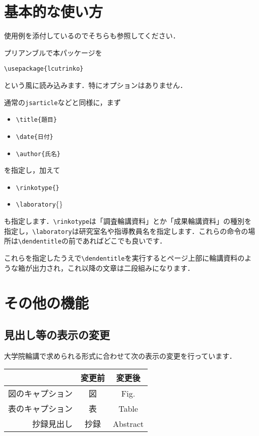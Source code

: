 \documentclass[uplatex,a4paper]{jsarticle}
\begin{document}
\section{基本的な使い方}

使用例を添付しているのでそちらも参照してください．

プリアンブルで本パッケージを
\begin{verbatim}
\usepackage{lcutrinko}
\end{verbatim}
という風に読み込みます．特にオプションはありません．

通常の\texttt{jsarticle}などと同様に，まず
\begin{itemize}
\item \texttt{{\textbackslash}title\{題目\}}
\item \texttt{{\textbackslash}date\{日付\}}
\item \texttt{{\textbackslash}author\{氏名\}}
\end{itemize}
を指定し，加えて
\begin{itemize}
\item \texttt{{\textbackslash}rinkotype\{\}}
\item \texttt{{\textbackslash}laboratory}\{\}
\end{itemize}
も指定します．\verb|\rinkotype|は「調査輪講資料」とか「成果輪講資料」の種別を指定し，\verb|\laboratory|は研究室名や指導教員名を指定します．これらの命令の場所は\verb|\dendentitle|の前であればどこでも良いです．

これらを指定したうえで\verb|\dendentitle|を実行するとページ上部に輪講資料のような箱が出力され，これ以降の文章は二段組みになります．

\section{その他の機能}

\subsection{見出し等の表示の変更}

大学院輪講で求められる形式に合わせて次の表示の変更を行っています．

\begin{table}[h]
  \centering
  \begin{tabular}[h]{r|cc}
                     & 変更前 & 変更後 \\ \hline
    図のキャプション & 図     & Fig.\\
    表のキャプション & 表     & Table\\
    抄録見出し       & 抄録   & Abstract
  \end{tabular}
\end{table}
\end{document}
